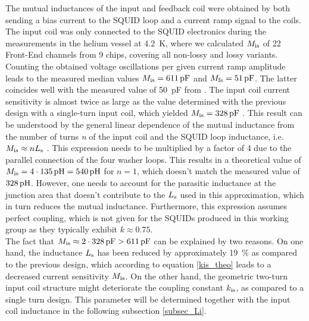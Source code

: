 The mutual inductances of the input and feedback coil were obtained by both sending a bias current to the SQUID loop and a current ramp signal to the coils. The input coil was only connected to the SQUID electronics during the measurements in the helium vessel at \qty{4.2}{\kelvin}, where we calculated $M_{\rm is}$ of 22 Front-End channels from 9 chips, covering all non-lossy and lossy variants. Counting the obtained voltage oscillations per given current ramp amplitude leads to the measured median values $M_{\rm is}=\qty{611}{\pico\farad}$ and $M_{\rm fs}=\qty{51}{\pico\farad}$. The latter coincides well with the measured value of \qty{50}{\pico\farad} from \cite{Bauer2022}. The input coil current sensitivity is almost twice as large as the value determined with the previous design with a single-turn input coil, which yielded $M_{\rm is}=\qty{328}{\pico\farad}$ \cite{Bauer2022}. This result can be understood by the general linear dependence of the mutual inductance from the number of turns \textit{n} of the input coil and the SQUID loop inductance, i.e. $M_{\rm is}\approx nL_{\rm s}$ \cite{Ketchen1981}. This expression needs to be multiplied by a factor of 4 due to the parallel connection of the four washer loops. This results in a theoretical value of $M_{\rm is}=4\cdot \qty{135}{\pH}=\qty{540}{\pH}$ for $n=1$, which doesn't match the measured value of $\qty{328}{\pH}$. However, one needs to account for the parasitic inductance at the junction area that doesn't contribute to the $L_{\rm s}$ used in this approximation, which in turn reduces the mutual inductance. Furthermore, this expression assumes perfect coupling, which is not given for the SQUIDs produced in this working group as they typically exhibit $k\approx 0.75$. \\ The fact that $M_{\rm is}\approx 2\cdot \qty{328}{\pico\farad}>\qty{611}{\pico\farad}$ can be explained by two reasons. On one hand, the inductance $L_{\rm s}$ has been reduced by approximately \qty{19}{\percent} as compared to the previous design, which according to equation \ref{kis_theo} leads to a decreased current sensitivity $M_{\rm is}$. On the other hand, the geometric two-turn input coil structure might deteriorate the coupling constant $k_{\rm is}$, as compared to a single turn design. This parameter will be determined together with the input coil inductance in the following subsection \ref{subsec_Li}.

